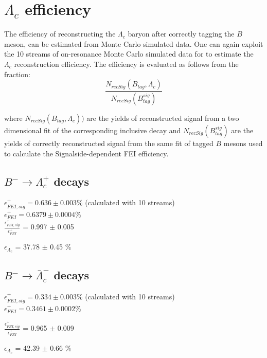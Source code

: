 \section{$\Lambda_c$ efficiency}
The efficiency of reconstructing the ${\Lambda_c}$ baryon after correctly tagging the  $B$ meson, can be estimated from Monte Carlo simulated data.
One can again exploit the  10 streams of on-resonance Monte Carlo simulated data for to estimate the $\Lambda_c$ reconstruction efficiency.
The efficiency is evaluated as follows from the fraction:  
\begin{equation}
    \frac{N_{recSig}(B_{tag}, \Lambda_c)}{N_{recSig}(B_{tag}^{sig})}
\end{equation}

\vspace{0.5cm}

\noindent where $N_{recSig}(B_{tag}, \Lambda_c))$ are the yields of reconstructed signal from a two dimensional fit of the corresponding inclusive decay
 and  $N_{recSig}(B_{tag}^{sig})$ are the yields of correctly reconstructed signal from the same fit of tagged $B$ mesons used to calculate the Signalside-dependent FEI efficiency. 

\subsection{$B^- \rightarrow \Lambda_c^+$ decays}
$\epsilon^+_{FEI,sig} = 0.636 \pm 0.003\%$ (calculated with 10 streams)\\
$\epsilon^+_{FEI} = 0.6379 \pm 0.0004\%$\\
$\frac{\epsilon^+_{FEI,sig}}{\epsilon^+_{FEI}}$ = 0.997 $\pm $ 0.005%

$\epsilon_{\Lambda_c}$ = 37.78 $\pm $ 0.45 $\%$ %

\subsection{$B^- \rightarrow \bar{\Lambda}_c^-$ decays}
$\epsilon^+_{FEI,sig} = 0.334 \pm 0.003\%$ (calculated with 10 streams)\\
$\epsilon^+_{FEI} = 0.3461 \pm 0.0002\%$

$\frac{\epsilon^+_{FEI,sig}}{\epsilon^+_{FEI}}$ = 0.965 $\pm $ 0.009%

$\epsilon_{\Lambda_c}$ = 42.39 $\pm $ 0.66 $\%$ %


